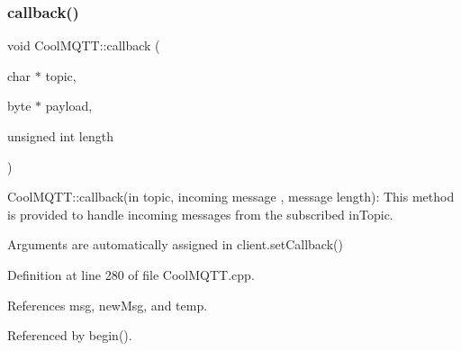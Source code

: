 \subsubsection{\texorpdfstring{callback()}{callback()}}
{\footnotesize\ttfamily void Cool\+M\+Q\+T\+T\+::callback (\begin{DoxyParamCaption}\item[{char $\ast$}]{topic,  }\item[{byte $\ast$}]{payload,  }\item[{unsigned int}]{length }\end{DoxyParamCaption})}

Cool\+M\+Q\+T\+T\+::callback(in topic, incoming message , message length)\+: This method is provided to handle incoming messages from the subscribed in\+Topic.

Arguments are automatically assigned in client.\+set\+Callback() 

Definition at line 280 of file Cool\+M\+Q\+T\+T.\+cpp.



References msg, new\+Msg, and temp.



Referenced by begin().


